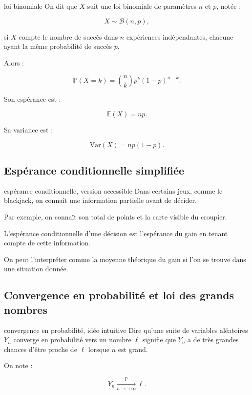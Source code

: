 \documentclass[11pt,a4paper]{article}
\newcommand{\E}{\mathbb{E}}
\newcommand{\V}{\mathrm{Var}}
\newcommand{\Prob}{\mathbb{P}}
\begin{document}
\begin{definitionbox}{loi binomiale}
On dit que $X$ suit une loi binomiale de paramètres $n$ et $p$, notée :

\[
X\sim \mathcal{B}(n,p),
\]

si $X$ compte le nombre de succès dans $n$ expériences indépendantes, chacune ayant la même probabilité de succès $p$.

Alors :

\[
\Prob(X=k)=\binom{n}{k}p^k(1-p)^{n-k}.
\]

Son espérance est :

\[
\E(X)=np.
\]

Sa variance est :

\[
\V(X)=np(1-p).
\]
\end{definitionbox}

\subsection{Espérance conditionnelle simplifiée}

\begin{definitionbox}{espérance conditionnelle, version accessible}
Dans certains jeux, comme le blackjack, on connaît une information partielle avant de décider.

Par exemple, on connaît son total de points et la carte visible du croupier.

L'espérance conditionnelle d'une décision est l'espérance du gain en tenant compte de cette information.

On peut l'interpréter comme la moyenne théorique du gain si l'on se trouve dans une situation donnée.
\end{definitionbox}

\subsection{Convergence en probabilité et loi des grands nombres}

\begin{definitionbox}{convergence en probabilité, idée intuitive}
Dire qu'une suite de variables aléatoires $Y_n$ converge en probabilité vers un nombre $\ell$ signifie que $Y_n$ a de très grandes chances d'être proche de $\ell$ lorsque $n$ est grand.

On note :

\[
Y_n \xrightarrow[n\to+\infty]{\mathbb{P}} \ell.
\]
\end{definitionbox}
\end{document}
